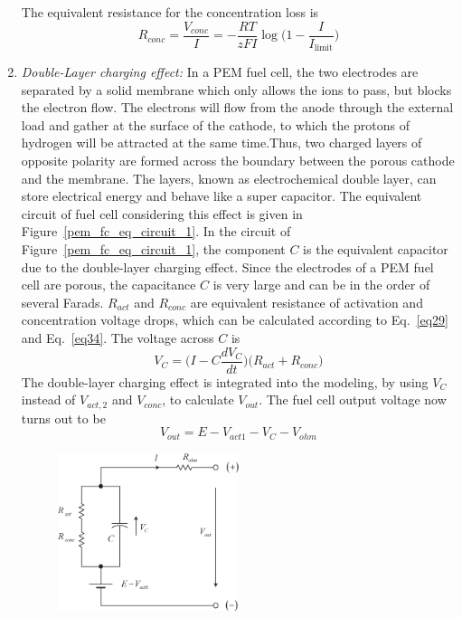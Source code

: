 \documentclass[11pt,a4paper]{article}
\numberwithin{equation}{section}
\theoremstyle{it}
\theoremstyle{definition}
\begin{document}
\begin{enumerate}
	The equivalent resistance for the concentration loss is
	\begin{equation}\label{eq34}
		R_{conc}=\frac{V_{conc}}{I}=-\frac{RT}{zFI}\log\Big(1-\frac{I}{I_{\text{limit}}}\Big)
	\end{equation} 
	\item \textit{Double-Layer charging effect:} In a PEM fuel cell, the two electrodes are separated by a solid membrane which only allows the  ions to pass, but blocks the electron flow. The electrons will flow from the anode through the external load and gather at the surface of the cathode, to which the protons of hydrogen will be attracted at the same time.Thus, two charged layers of opposite polarity are formed across the boundary between the porous cathode and the membrane. The layers, known as electrochemical double layer, can store electrical energy and behave like a super capacitor. The equivalent circuit of fuel cell considering this effect is given in Figure~\ref{pem_fc_eq_circuit_1}. In the circuit of Figure~\ref{pem_fc_eq_circuit_1}, the component $C$ is the equivalent capacitor due to the double-layer charging effect. Since the electrodes of a PEM fuel cell are porous, the capacitance $C$ is very large and can be in the order of several Farads. $R_{act}$ and $R_{conc}$ are equivalent resistance of activation and concentration voltage drops, which can be calculated according to Eq.~\eqref{eq29} and Eq.~\eqref{eq34}. The voltage across $C$ is
	\begin{equation}\label{eq35}
		V_{C}=\Big(I-C\frac{dV_C}{dt}\Big)\big(R_{act}+R_{conc}\big)
	\end{equation} 
The double-layer charging effect is integrated into the modeling, by using $V_C$ instead of $V_{act,2}$ and $V_{conc}$, to calculate $V_{out}$. The fuel cell output voltage now turns out to be
\begin{equation}\label{eq36}
	V_{out} = E - V_{act1} - V_C - V_{ohm}
\end{equation}
\begin{figure}[H]
	\centering
	\includegraphics[width = 0.5\textwidth, width = 250pt, angle = 0, keepaspectratio]{figures/pem_fuel_cell/pemfc_eq_circuit_1.eps}

\end{figure}
\end{enumerate}
\end{document}
